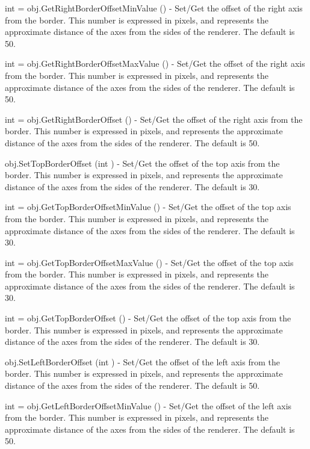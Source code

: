 \begin{DoxyItemize}
\item {\ttfamily int = obj.\-Get\-Right\-Border\-Offset\-Min\-Value ()} -\/ Set/\-Get the offset of the right axis from the border. This number is expressed in pixels, and represents the approximate distance of the axes from the sides of the renderer. The default is 50.  
\item {\ttfamily int = obj.\-Get\-Right\-Border\-Offset\-Max\-Value ()} -\/ Set/\-Get the offset of the right axis from the border. This number is expressed in pixels, and represents the approximate distance of the axes from the sides of the renderer. The default is 50.  
\item {\ttfamily int = obj.\-Get\-Right\-Border\-Offset ()} -\/ Set/\-Get the offset of the right axis from the border. This number is expressed in pixels, and represents the approximate distance of the axes from the sides of the renderer. The default is 50.  
\item {\ttfamily obj.\-Set\-Top\-Border\-Offset (int )} -\/ Set/\-Get the offset of the top axis from the border. This number is expressed in pixels, and represents the approximate distance of the axes from the sides of the renderer. The default is 30.  
\item {\ttfamily int = obj.\-Get\-Top\-Border\-Offset\-Min\-Value ()} -\/ Set/\-Get the offset of the top axis from the border. This number is expressed in pixels, and represents the approximate distance of the axes from the sides of the renderer. The default is 30.  
\item {\ttfamily int = obj.\-Get\-Top\-Border\-Offset\-Max\-Value ()} -\/ Set/\-Get the offset of the top axis from the border. This number is expressed in pixels, and represents the approximate distance of the axes from the sides of the renderer. The default is 30.  
\item {\ttfamily int = obj.\-Get\-Top\-Border\-Offset ()} -\/ Set/\-Get the offset of the top axis from the border. This number is expressed in pixels, and represents the approximate distance of the axes from the sides of the renderer. The default is 30.  
\item {\ttfamily obj.\-Set\-Left\-Border\-Offset (int )} -\/ Set/\-Get the offset of the left axis from the border. This number is expressed in pixels, and represents the approximate distance of the axes from the sides of the renderer. The default is 50.  
\item {\ttfamily int = obj.\-Get\-Left\-Border\-Offset\-Min\-Value ()} -\/ Set/\-Get the offset of the left axis from the border. This number is expressed in pixels, and represents the approximate distance of the axes from the sides of the renderer. The default is 50.  

\end{DoxyItemize}
